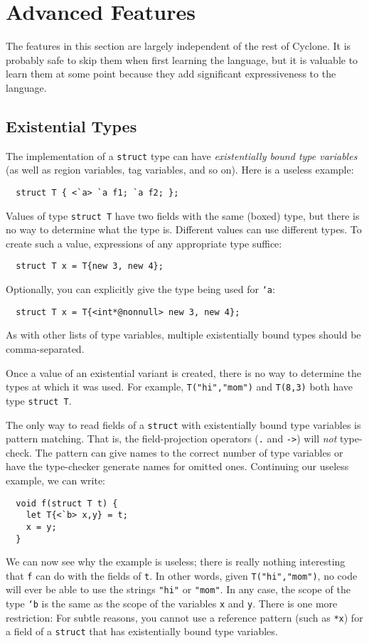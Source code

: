\section{Advanced Features}
\label{sec:advanced}

The features in this section are largely independent of the rest of
Cyclone.  It is probably safe to skip them when first learning the
language, but it is valuable to learn them at some point because they
add significant expressiveness to the language.

\subsection{Existential Types}

The implementation of a \texttt{struct} type can have
\emph{existentially bound type variables} (as well as region
variables, tag variables, and so on).  Here is a useless example:
\begin{verbatim}
  struct T { <`a> `a f1; `a f2; };
\end{verbatim}
Values of type \texttt{struct T} have two fields with the same (boxed)
type, but there is no way to determine what the type is.  Different
values can use different types.  To create
such a value, expressions of any appropriate type suffice:
\begin{verbatim}
  struct T x = T{new 3, new 4};
\end{verbatim}
Optionally, you can explicitly give the type being used for
\texttt{`a}:
\begin{verbatim}
  struct T x = T{<int*@nonnull> new 3, new 4};
\end{verbatim}
As with other lists of type variables, multiple existentially bound
types should be comma-separated.

Once a value of an existential variant is created, there is no way to
determine the types at which it was used.  For example,
\texttt{T("hi","mom")} and \texttt{T(8,3)} both have type
\texttt{struct T}.

The only way to read fields of a \texttt{struct} with existentially
bound type variables is pattern matching.  That is, the
field-projection operators (\texttt{.} and \texttt{->}) will
\emph{not} type-check.  The pattern can give names to the correct
number of type variables or have the type-checker generate names for
omitted ones.
Continuing our useless example, we can write:
\begin{verbatim}
  void f(struct T t) {
    let T{<`b> x,y} = t;
    x = y;
  }
\end{verbatim}
We can now see why the example is useless; there is really nothing
interesting that \texttt{f} can do with the fields of \texttt{t}.  In
other words, given \texttt{T("hi","mom")}, no code will ever be
able to use the strings \texttt{"hi"} or \texttt{"mom"}. In any case,
the scope of the type \texttt{`b} is the same as the scope of the
variables \texttt{x} and \texttt{y}.  There is one more restriction:
For subtle reasons, you cannot use a reference pattern (such as
\texttt{*x}) for a field of a \texttt{struct} that has existentially
bound type variables.

